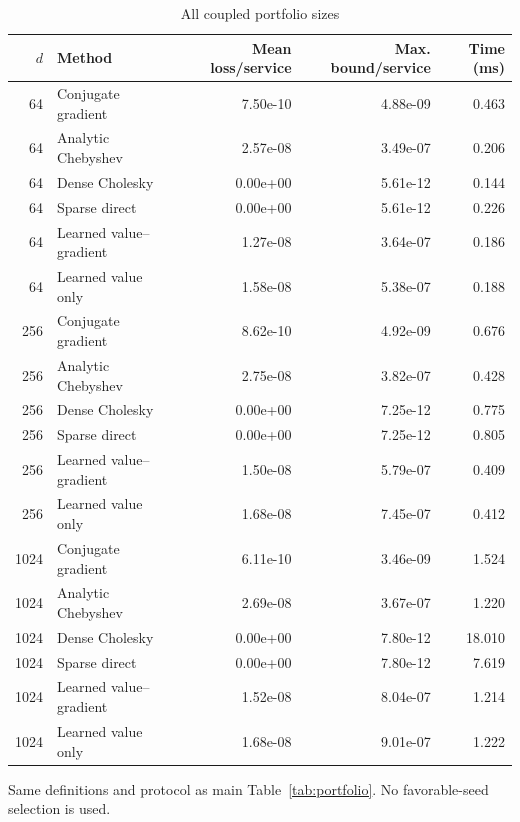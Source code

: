 \begin{table}[!ht]
\centering
\caption{All coupled portfolio sizes}\label{tab:portfolio-all}
\begin{tabular}{rlrrr}\toprule
$d$ & Method & Mean loss/service & Max. bound/service & Time (ms)\\
\midrule
64 & Conjugate gradient & 7.50e-10 & 4.88e-09 & 0.463\\
64 & Analytic Chebyshev & 2.57e-08 & 3.49e-07 & 0.206\\
64 & Dense Cholesky & 0.00e+00 & 5.61e-12 & 0.144\\
64 & Sparse direct & 0.00e+00 & 5.61e-12 & 0.226\\
64 & Learned value--gradient & 1.27e-08 & 3.64e-07 & 0.186\\
64 & Learned value only & 1.58e-08 & 5.38e-07 & 0.188\\
256 & Conjugate gradient & 8.62e-10 & 4.92e-09 & 0.676\\
256 & Analytic Chebyshev & 2.75e-08 & 3.82e-07 & 0.428\\
256 & Dense Cholesky & 0.00e+00 & 7.25e-12 & 0.775\\
256 & Sparse direct & 0.00e+00 & 7.25e-12 & 0.805\\
256 & Learned value--gradient & 1.50e-08 & 5.79e-07 & 0.409\\
256 & Learned value only & 1.68e-08 & 7.45e-07 & 0.412\\
1024 & Conjugate gradient & 6.11e-10 & 3.46e-09 & 1.524\\
1024 & Analytic Chebyshev & 2.69e-08 & 3.67e-07 & 1.220\\
1024 & Dense Cholesky & 0.00e+00 & 7.80e-12 & 18.010\\
1024 & Sparse direct & 0.00e+00 & 7.80e-12 & 7.619\\
1024 & Learned value--gradient & 1.52e-08 & 8.04e-07 & 1.214\\
1024 & Learned value only & 1.68e-08 & 9.01e-07 & 1.222\\
\bottomrule\end{tabular}
\par\smallskip\begin{minipage}{.98\textwidth}\small Same definitions and protocol as main Table~\ref{tab:portfolio}. No favorable-seed selection is used.\end{minipage}
\end{table}
